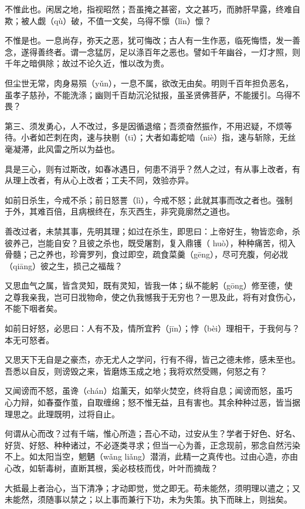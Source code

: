 \documentclass[12pt,UTF8]{ctexbook}
\begin{document}
不惟此也。闲居之地，指视昭然；吾虽掩之甚密，文之甚巧，而肺肝早露，终难自欺；被人觑（qù）破，不值一文矣，乌得不懔（lǐn）懔？

不惟是也。一息尚存，弥天之恶，犹可悔改；古人有一生作恶，临死悔悟，发一善念，遂得善终者。谓一念猛厉，足以涤百年之恶也。譬如千年幽谷，一灯才照，则千年之暗俱除；故过不论久近，惟以改为贵。

但尘世无常，肉身易殒（yǔn），一息不属，欲改无由矣。明则千百年担负恶名，虽孝子慈孙，不能洗涤；幽则千百劫沉沦狱报，虽圣贤佛菩萨，不能援引。乌得不畏？

第三、须发勇心，人不改过，多是因循退缩；吾须奋然振作，不用迟疑，不烦等待。小者如芒刺在肉，速与抉剔（tī）；大者如毒蛇啮（niè）指，速与斩除，无丝毫凝滞，此风雷之所以为益也。

具是三心，则有过斯改，如春冰遇日，何患不消乎？然人之过，有从事上改者，有从理上改者，有从心上改者；工夫不同，效验亦异。

如前日杀生，今戒不杀；前日怒詈（lì），今戒不怒；此就其事而改之者也。强制于外，其难百倍，且病根终在，东灭西生，非究竟廓然之道也。

善改过者，未禁其事，先明其理；如过在杀生，即思曰：上帝好生，物皆恋命，杀彼养己，岂能自安？且彼之杀也，既受屠割，复入鼎镬（ huò），种种痛苦，彻入骨髓；己之养也，珍膏罗列，食过即空，疏食菜羹（gēng），尽可充腹，何必戕（qiāng）彼之生，损己之福哉？

又思血气之属，皆含灵知，既有灵知，皆我一体；纵不能躬（gōng）修至德，使之尊我亲我，岂可日戕物命，使之仇我憾我于无穷也？一思及此，将有对食伤心，不能下咽者矣。

如前日好怒，必思曰：人有不及，情所宜矜（jīn）；悖（bèi）理相干，于我何与？本无可怒者。

又思天下无自是之豪杰，亦无尤人之学问，行有不得，皆己之德未修，感未至也。吾悉以自反，则谤毁之来，皆磨炼玉成之地；我将欢然受赐，何怒之有？

又闻谤而不怒，虽谗（chán）焰薰天，如举火焚空，终将自息；闻谤而怒，虽巧心力辩，如春蚕作茧，自取缠绵；怒不惟无益，且有害也。其余种种过恶，皆当据理思之。此理既明，过将自止。

何谓从心而改？过有千端，惟心所造；吾心不动，过安从生？学者于好色、好名、好货、好怒、种种诸过，不必逐类寻求；但当一心为善，正念现前，邪念自然污染不上。如太阳当空，魍魉（wǎng  liǎng）潜消，此精一之真传也。过由心造，亦由心改，如斩毒树，直断其根，奚必枝枝而伐，叶叶而摘哉？

大抵最上者治心，当下清净；才动即觉，觉之即无。苟未能然，须明理以遣之；又未能然，须随事以禁之；以上事而兼行下功，未为失策。执下而昧上，则拙矣。
\end{document}
